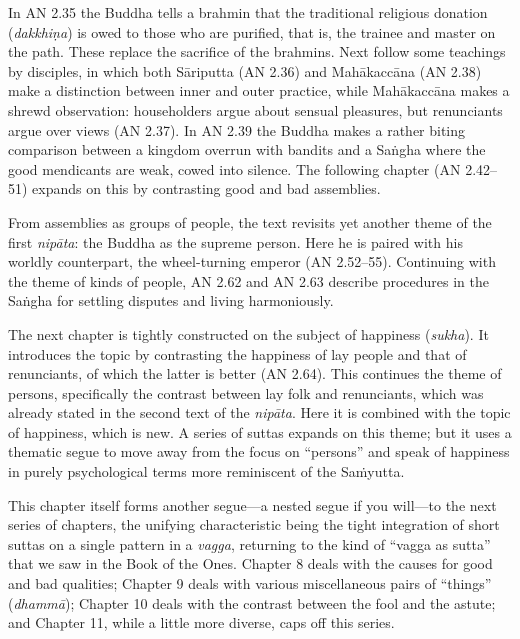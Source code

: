 \documentclass[12pt,openany]{book}%
\begin{document}
In AN 2.35 the Buddha tells a brahmin that the traditional religious donation (\textit{\textsanskrit{dakkhiṇa}}) is owed to those who are purified, that is, the trainee and master on the path. These replace the sacrifice of the brahmins. Next follow some teachings by disciples, in which both \textsanskrit{Sāriputta} (AN 2.36) and \textsanskrit{Mahākaccāna} (AN 2.38) make a distinction between inner and outer practice, while \textsanskrit{Mahākaccāna} makes a shrewd observation: householders argue about sensual pleasures, but renunciants argue over views (AN 2.37). In AN 2.39 the Buddha makes a rather biting comparison between a kingdom overrun with bandits and a \textsanskrit{Saṅgha} where the good mendicants are weak, cowed into silence. The following chapter (AN 2.42–51) expands on this by contrasting good and bad assemblies.

From assemblies as groups of people, the text revisits yet another theme of the first \textit{\textsanskrit{nipāta}}: the Buddha as the supreme person. Here he is paired with his worldly counterpart, the wheel-turning emperor (AN 2.52–55). Continuing with the theme of kinds of people, AN 2.62 and AN 2.63 describe procedures in the \textsanskrit{Saṅgha} for settling disputes and living harmoniously.

The next chapter is tightly constructed on the subject of happiness (\textit{sukha}). It introduces the topic by contrasting the happiness of lay people and that of renunciants, of which the latter is better (AN 2.64). This continues the theme of persons, specifically the contrast between lay folk and renunciants, which was already stated in the second text of the \textit{\textsanskrit{nipāta}}. Here it is combined with the topic of happiness, which is new. A series of suttas expands on this theme; but it uses a thematic segue to move away from the focus on “persons” and speak of happiness in purely psychological terms more reminiscent of the \textsanskrit{Saṁyutta}.

This chapter itself forms another segue—a nested segue if you will—to the next series of chapters, the unifying characteristic being the tight integration of short suttas on a single pattern in a \textit{vagga}, returning to the kind of “vagga as sutta” that we saw in the Book of the Ones. Chapter 8 deals with the causes for good and bad qualities; Chapter 9 deals with various miscellaneous pairs of “things” (\textit{\textsanskrit{dhammā}}); Chapter 10 deals with the contrast between the fool and the astute; and Chapter 11, while a little more diverse, caps off this series.
\end{document}
